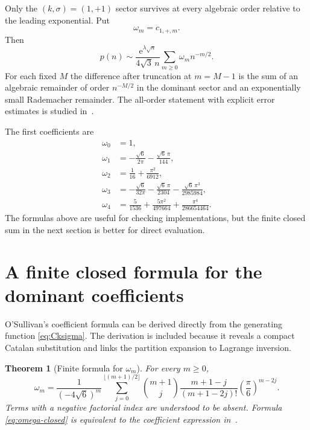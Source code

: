 \documentclass[11pt,a4paper]{article}
\numberwithin{equation}{section}
\newtheorem{theorem}{Theorem}[section]
\theoremstyle{remark}
\newcommand{\e}{\mathrm e}
\begin{document}
Only the $(k,\sigma)=(1,+1)$ sector survives at every algebraic order relative to the leading exponential.  Put
\begin{equation}\label{eq:omega-def}
 \omega_m=c_{1,+,m}.
\end{equation}
Then
\begin{equation}\label{eq:dominant-poincare}
 p(n)\sim \frac{\e^{\lambda\sqrt n}}{4\sqrt3\,n}
 \sum_{m\ge0}\omega_m n^{-m/2}.
\end{equation}
For each fixed $M$ the difference after truncation at $m=M-1$ is the sum of an algebraic remainder of order $n^{-M/2}$ in the dominant sector and an exponentially small Rademacher remainder.  The all-order statement with explicit error estimates is studied in~\cite{OSullivan2023,BanerjeeEtAl2022}.

The first coefficients are
\begin{align}
 \omega_0&=1,\nonumber\\
 \omega_1&=-\frac{\sqrt6}{2\pi}-\frac{\sqrt6\,\pi}{144},\nonumber\\
 \omega_2&=\frac1{16}+\frac{\pi^2}{6912},\nonumber\\
 \omega_3&=-\frac{\sqrt6}{32\pi}
 -\frac{\sqrt6\,\pi}{2304}
 -\frac{\sqrt6\,\pi^3}{2985984},\label{eq:omega-first}\\
 \omega_4&=\frac5{1536}+\frac{5\pi^2}{497664}
 +\frac{\pi^4}{286654464}.\nonumber
\end{align}
The formulas above are useful for checking implementations, but the finite closed sum in the next section is better for direct evaluation.

\section{A finite closed formula for the dominant coefficients}\label{sec:osullivan}

O'Sullivan's coefficient formula can be derived directly from the generating function \cref{eq:Cksigma}.  The derivation is included because it reveals a compact Catalan substitution and links the partition expansion to Lagrange inversion.

\begin{theorem}[Finite formula for $\omega_m$]\label{thm:omega-closed}
For every $m\ge0$,
\begin{equation}\label{eq:omega-closed}
 \boxed{
 \omega_m=\frac1{(-4\sqrt6)^m}
 \sum_{j=0}^{\lfloor(m+1)/2\rfloor}
 \binom{m+1}{j}
 \frac{m+1-j}{(m+1-2j)!}
 \left(\frac{\pi}{6}\right)^{m-2j}.}
\end{equation}
Terms with a negative factorial index are understood to be absent.  Formula \cref{eq:omega-closed} is equivalent to the coefficient expression in~\cite{OSullivan2023,BanerjeeEtAl2022}.
\end{theorem}
\end{document}
